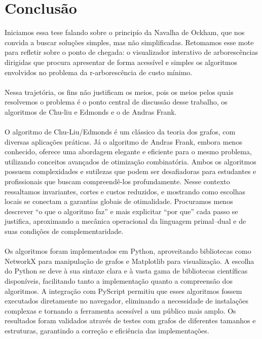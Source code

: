 \documentclass[12pt,a4paper]{article}
\begin{document}
\section{Conclusão}
Iniciamos essa tese falando sobre o principío da Navalha de Ockham, que nos convida a buscar soluções simples, mas não simplificadas. Retomamos esse mote para refletir sobre o ponto de chegada: o visualizador interativo de arborescências dirigidas que procura apresentar de forma acessível e simples os algoritmos envolvidos no problema da r-arborescência de custo mínimo.

\paragraph{}
Nessa trajetória, os fins não justificam os meios, pois os meios pelos quais resolvemos o problema é o ponto central de discussão desse trabalho, os algoritmos de Chu-liu e Edmonds e o de Andras Frank.

\paragraph{}
O algoritmo de Chu-Liu/Edmonds é um clássico da teoria dos grafos, com diversas aplicações práticas. Já o algoritmo de Andras Frank, embora menos conhecido, oferece uma abordagem elegante e eficiente para o mesmo problema, utilizando conceitos avançados de otimização combinatória. Ambos os algoritmos possuem complexidades e sutilezas que podem ser desafiadoras para estudantes e profissionais que buscam compreendê-los profundamente. Nesse contexto ressaltamos invariantes, cortes e custos reduzidos, e mostrando como escolhas locais se conectam a garantias globais de otimalidade. Procuramos menos descrever “o que o algoritmo faz” e mais explicitar “por que” cada passo se justifica, aproximando a mecânica operacional da linguagem primal--dual e de suas condições de complementaridade.

\paragraph{}
Os algoritmos foram implementados em Python, aproveitando bibliotecas como NetworkX para manipulação de grafos e Matplotlib para visualização. A escolha do Python se deve à sua sintaxe clara e à vasta gama de bibliotecas científicas disponíveis, facilitando tanto a implementação quanto a compreensão dos algoritmos. A integração com PyScript permitiu que esses algoritmos fossem executados diretamente no navegador, eliminando a necessidade de instalações complexas e tornando a ferramenta acessível a um público mais amplo. Os resultados foram validados através de testes com grafos de diferentes tamanhos e estruturas, garantindo a correção e eficiência das implementações.
\end{document}
